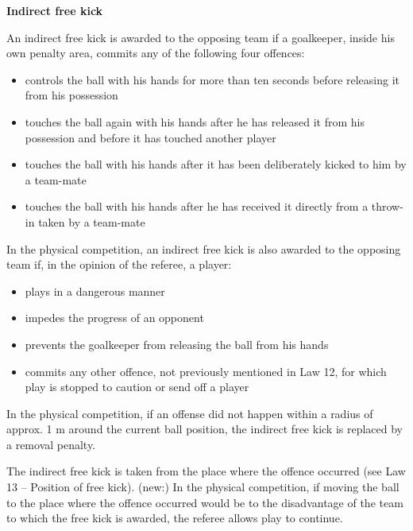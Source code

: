 \bigskip

{\bfseries Indirect free kick}

\headlinebox

An indirect free kick is awarded to the opposing team if a goalkeeper, inside his own penalty area, commits any of the following four offences: 

\begin{itemize}
\item controls the ball with his hands for more than ten seconds before releasing it from his possession
\item touches the ball again with his hands after he has released it from his possession and before it has touched another player
\item touches the ball with his hands after it has been deliberately kicked to him by a team-mate
\item touches the ball with his hands after he has received it directly from a throw-in taken by a team-mate
\end{itemize}

\bigskip

In the physical competition, an indirect free kick is also awarded to the opposing team if, in the opinion of the referee, a player:

\begin{itemize}
\item plays in a dangerous manner
\item impedes the progress of an opponent
\item prevents the goalkeeper from releasing the ball from his hands
\item commits any other offence, not previously mentioned in Law 12, for which play is stopped to caution or send off a player
\end{itemize}

\bigskip


In the physical competition, if an offense did not happen within a radius of approx. 1 m
around the current ball position, the indirect free kick is replaced by a
removal penalty.


  \bigskip


The indirect free kick is taken from the place where the offence occurred (see Law 13 -- Position of free kick).
(new:) In the physical competition, if moving the ball to the place where the offence occurred would be to the disadvantage of the team to which the free kick is awarded, the referee allows play to continue.

